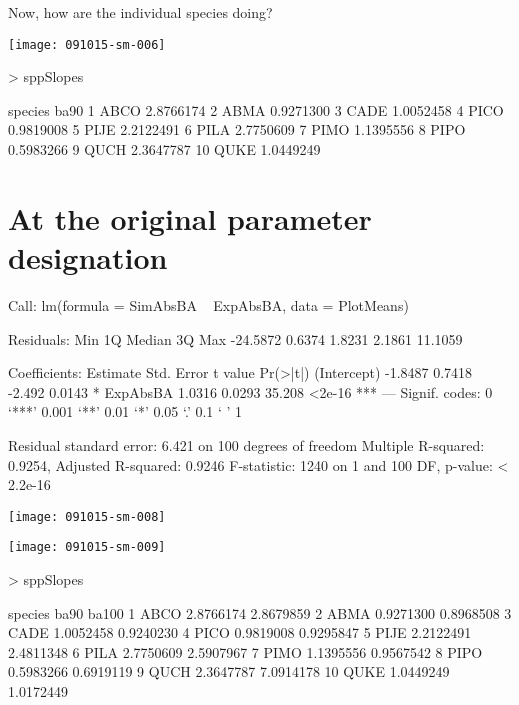 \documentclass{article}
\begin{document}
Now, how are the individual species doing?

\texttt{[image: 091015-sm-006]}
\begin{Schunk}
\begin{Sinput}
>   sppSlopes
\end{Sinput}
\begin{Soutput}
   species      ba90
1     ABCO 2.8766174
2     ABMA 0.9271300
3     CADE 1.0052458
4     PICO 0.9819008
5     PIJE 2.2122491
6     PILA 2.7750609
7     PIMO 1.1395556
8     PIPO 0.5983266
9     QUCH 2.3647787
10    QUKE 1.0449249
\end{Soutput}
\end{Schunk}


\newpage
\section{At the original parameter designation}
\begin{Schunk}
\begin{Soutput}
Call:
lm(formula = SimAbsBA ~ ExpAbsBA, data = PlotMeans)

Residuals:
     Min       1Q   Median       3Q      Max 
-24.5872   0.6374   1.8231   2.1861  11.1059 

Coefficients:
            Estimate Std. Error t value Pr(>|t|)    
(Intercept)  -1.8487     0.7418  -2.492   0.0143 *  
ExpAbsBA      1.0316     0.0293  35.208   <2e-16 ***
---
Signif. codes:  0 ‘***’ 0.001 ‘**’ 0.01 ‘*’ 0.05 ‘.’ 0.1 ‘ ’ 1

Residual standard error: 6.421 on 100 degrees of freedom
Multiple R-squared:  0.9254,	Adjusted R-squared:  0.9246 
F-statistic:  1240 on 1 and 100 DF,  p-value: < 2.2e-16
\end{Soutput}
\end{Schunk}
\texttt{[image: 091015-sm-008]}

\texttt{[image: 091015-sm-009]}
\begin{Schunk}
\begin{Sinput}
>   sppSlopes
\end{Sinput}
\begin{Soutput}
   species      ba90     ba100
1     ABCO 2.8766174 2.8679859
2     ABMA 0.9271300 0.8968508
3     CADE 1.0052458 0.9240230
4     PICO 0.9819008 0.9295847
5     PIJE 2.2122491 2.4811348
6     PILA 2.7750609 2.5907967
7     PIMO 1.1395556 0.9567542
8     PIPO 0.5983266 0.6919119
9     QUCH 2.3647787 7.0914178
10    QUKE 1.0449249 1.0172449
\end{Soutput}
\end{Schunk}
\end{document}
